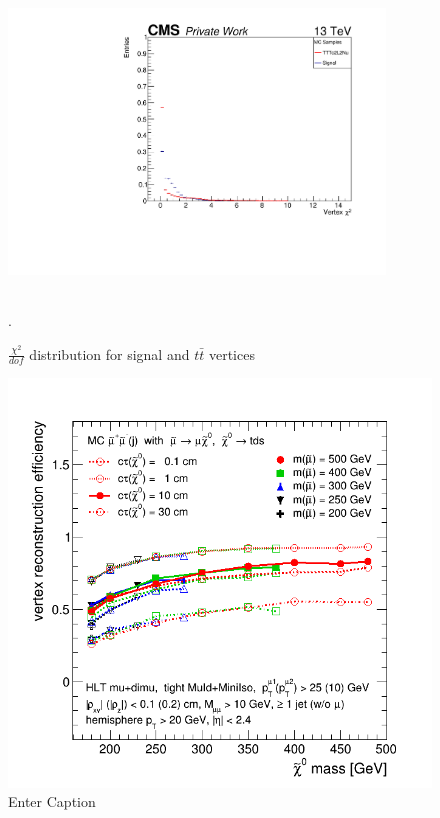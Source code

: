 \documentclass{cernatlasnote}
\begin{document}
\begin{figure}[ht]
\centering
\includegraphics[height=8cm, width=10cm, trim= 0cm 0cm 0cm 0cm,clip]{images/VTXBDT/plot_VtxChi.pdf}
\caption{\label{fig:VTXChi2} $\frac{\chi^2}{dof}$ distribution for signal and $t\bar{t}$ vertices}. 
\end{figure} 
\pagebreak





\begin{figure}
    \centering
    \includegraphics[width=0.5\linewidth]{images/eff_ctau_240416.png}
    \caption{Enter Caption}
    \label{fig:enter-label}
\end{figure}



\end{document}
